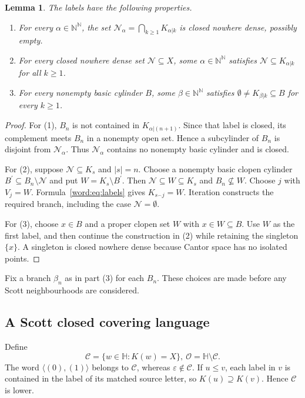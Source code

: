 \documentclass[10pt,a4paper]{article}
\newtheorem{lemma}[theorem]{Lemma}
\theoremstyle{definition}
\newcommand{\N}{\mathbb N}
\newcommand{\HH}{\mathbb H}
\begin{document}
\begin{lemma}\label{word:lem:labels}
The labels have the following properties.
\begin{enumerate}[\rm (1)]
\item For every $\alpha\in\N^\N$, the set
      $\mathcal N_\alpha=\bigcap_{k\geq1}K_{\alpha|k}$ is closed nowhere dense, possibly empty.
\item For every closed nowhere dense set $\mathcal N\subseteq X$, some $\alpha\in\N^\N$ satisfies
      $\mathcal N\subseteq K_{\alpha|k}$ for all $k\geq1$.
\item For every nonempty basic cylinder $B$, some $\beta\in\N^\N$ satisfies
      $\emptyset\neq K_{\beta|k}\subseteq B$ for every $k\geq1$.
\end{enumerate}
\end{lemma}
\begin{proof}
For (1), $B_n$ is not contained in $K_{\alpha|(n+1)}$. Since that label is closed, its complement meets $B_n$ in a nonempty open set. Hence a subcylinder of $B_n$ is disjoint from $\mathcal N_\alpha$. Thus $\mathcal N_\alpha$ contains no nonempty basic cylinder and is closed.

For (2), suppose $\mathcal N\subseteq K_s$ and $|s|=n$. Choose a nonempty basic clopen cylinder $B^\prime\subseteq B_n\setminus\mathcal N$ and put $W=K_s\setminus B^\prime$. Then $\mathcal N\subseteq W\subseteq K_s$ and $B_n\not\subseteq W$. Choose $j$ with $V_j=W$. Formula~\eqref{word:eq:labels} gives $K_{s^\frown j}=W$. Iteration constructs the required branch, including the case $\mathcal N=\emptyset$.

For (3), choose $x\in B$ and a proper clopen set $W$ with $x\in W\subseteq B$. Use $W$ as the first label, and then continue the construction in (2) while retaining the singleton $\{x\}$. A singleton is closed nowhere dense because Cantor space has no isolated points.
\end{proof}
Fix a branch $\beta_n$ as in part (3) for each $B_n$. These choices are made before any Scott neighbourhoods are considered.

\subsection{A Scott closed covering language}
Define
\begin{equation}\label{word:eq:cover}
 \mathcal C=\{w\in\HH:K(w)=X\},
 ~
 \mathcal O=\HH\setminus\mathcal C.
\end{equation}
The word $\langle(0),(1)\rangle$ belongs to $\mathcal C$, whereas $\varepsilon\notin\mathcal C$. If $u\leq v$, each label in $v$ is contained in the label of its matched source letter, so $K(u)\supseteq K(v)$. Hence $\mathcal C$ is lower.
\end{document}
